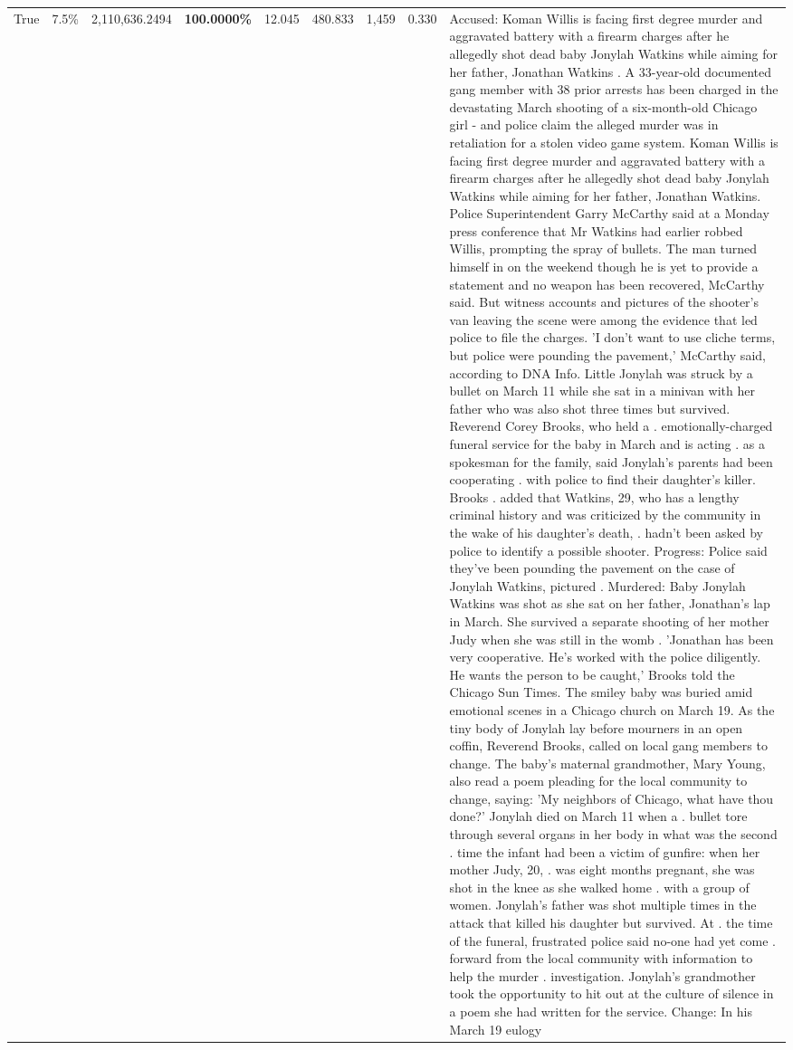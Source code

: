 \begin{table}[H]
\begin{tabular}{lllrlllll}
True & 7.5\% & 2,110,636.2494 & \bfseries \color{red} 100.0000\% & 12.045 & 480.833 & 1,459 & 0.330 & Accused: Koman Willis is facing first degree murder and aggravated battery with a firearm charges after he allegedly shot dead baby Jonylah Watkins while aiming for her father, Jonathan Watkins . A 33-year-old documented gang member with 38 prior arrests has been charged in the devastating March shooting of a six-month-old Chicago girl - and police claim the alleged murder was in retaliation for a stolen video game system. Koman Willis is facing first degree murder and aggravated battery with a firearm charges after he allegedly shot dead baby Jonylah Watkins while aiming for her father, Jonathan Watkins. Police Superintendent Garry McCarthy said at a Monday press conference that Mr Watkins had earlier robbed Willis, prompting the spray of bullets. The man turned himself in on the weekend though he is yet to provide a statement and no weapon has been recovered, McCarthy said. But witness accounts and pictures of the shooter's van leaving the scene were among the evidence that led police to file the charges. 'I don't want to use cliche terms, but police were pounding the pavement,' McCarthy said, according to DNA Info. Little Jonylah was struck by a bullet on March 11 while she sat in a minivan with her father who was also shot three times but survived. Reverend Corey Brooks, who held a . emotionally-charged funeral service for the baby in March and is acting . as a spokesman for the family, said Jonylah's parents had been cooperating . with police to find their daughter's killer. Brooks . added that Watkins, 29, who has a lengthy criminal history and was criticized by the community in the wake of his daughter's death, . hadn't been asked by police to identify a possible shooter. Progress: Police said they've been pounding the pavement on the case of Jonylah Watkins, pictured . Murdered: Baby Jonylah Watkins was shot as she sat on her father, Jonathan's lap in March. She survived a separate shooting of her mother Judy when she was still in the womb . 'Jonathan has been very cooperative. He's worked with the police diligently. He wants the person to be caught,' Brooks told the Chicago Sun Times. The smiley baby was buried amid emotional scenes in a Chicago church on March 19. As the tiny body of Jonylah lay before mourners in an open coffin, Reverend Brooks, called on local gang members to change. The baby's maternal grandmother, Mary Young, also read a poem pleading for the local community to change, saying: 'My neighbors of Chicago, what have thou done?' Jonylah died on March 11 when a . bullet tore through several organs in her body in what was the second . time the infant had been a victim of gunfire: when her mother Judy, 20, . was eight months pregnant, she was shot in the knee as she walked home . with a group of women. Jonylah's father was shot multiple times in the attack that killed his daughter but survived. At . the time of the funeral, frustrated police said no-one had yet come . forward from the local community with information to help the murder . investigation. Jonylah's grandmother took the opportunity to hit out at the culture of silence in a poem she had written for the service. Change: In his March 19 eulogy 
\end{tabular}
\end{table}
